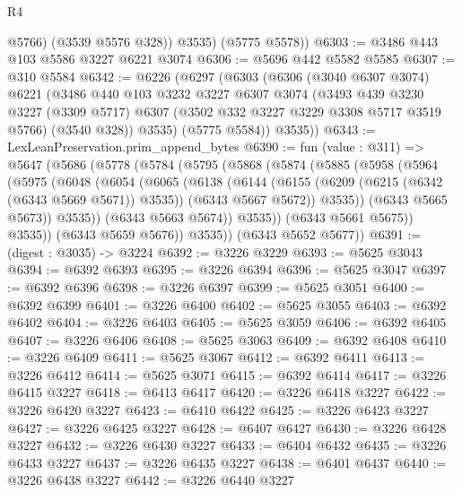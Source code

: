 \begin{lexlean}{R4}
\begin{coremodule}
            @5766)
          (@3539 @5576 @328))
        @3535)
      (@5775 @5578))
@6303 := @3486 @443 @103 @5586 @3227 @6221 @3074
@6306 := @5696 @442 @5582 @5585
@6307 := @310 @5584
@6342 := @6226
    (@6297
      (@6303
        (@6306
          (@3040 @6307 @3074)
          @6221
          (@3486
            @440
            @103
            @3232
            @3227
            @6307
            @3074
            (@3493
              @439
              @3230
              @3227
              (@3309 @5717)
              @6307
              (@3502 @332 @3227 @3229 @3308 @5717 @3519 @5766)
              (@3540 @328))
            @3535)
          (@5775 @5584))
        @3535))
@6343 := LexLeanPreservation.prim_append_bytes
@6390 := fun (value : @311) =>
  @5647
    (@5686
      (@5778
        (@5784
          (@5795
            (@5868
              (@5874
                (@5885
                  (@5958
                    (@5964
                      (@5975
                        (@6048
                          (@6054
                            (@6065
                              (@6138
                                (@6144
                                  (@6155
                                    (@6209 (@6215 (@6342 (@6343 @5669 @5671)) @3535))
                                    (@6343 @5667 @5672))
                                  @3535))
                              (@6343 @5665 @5673))
                            @3535))
                        (@6343 @5663 @5674))
                      @3535))
                  (@6343 @5661 @5675))
                @3535))
            (@6343 @5659 @5676))
          @3535))
      (@6343 @5652 @5677))
@6391 := (digest : @3035) -> @3224
@6392 := @3226 @3229
@6393 := @5625 @3043
@6394 := @6392 @6393
@6395 := @3226 @6394
@6396 := @5625 @3047
@6397 := @6392 @6396
@6398 := @3226 @6397
@6399 := @5625 @3051
@6400 := @6392 @6399
@6401 := @3226 @6400
@6402 := @5625 @3055
@6403 := @6392 @6402
@6404 := @3226 @6403
@6405 := @5625 @3059
@6406 := @6392 @6405
@6407 := @3226 @6406
@6408 := @5625 @3063
@6409 := @6392 @6408
@6410 := @3226 @6409
@6411 := @5625 @3067
@6412 := @6392 @6411
@6413 := @3226 @6412
@6414 := @5625 @3071
@6415 := @6392 @6414
@6417 := @3226 @6415 @3227
@6418 := @6413 @6417
@6420 := @3226 @6418 @3227
@6422 := @3226 @6420 @3227
@6423 := @6410 @6422
@6425 := @3226 @6423 @3227
@6427 := @3226 @6425 @3227
@6428 := @6407 @6427
@6430 := @3226 @6428 @3227
@6432 := @3226 @6430 @3227
@6433 := @6404 @6432
@6435 := @3226 @6433 @3227
@6437 := @3226 @6435 @3227
@6438 := @6401 @6437
@6440 := @3226 @6438 @3227
@6442 := @3226 @6440 @3227

\end{coremodule}
\end{lexlean}
